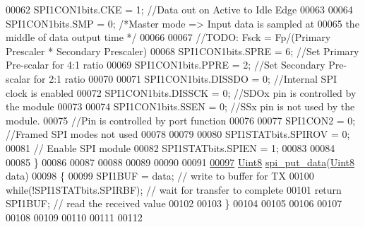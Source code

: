 \begin{DoxyCode}
00062         SPI1CON1bits.CKE        = 1;   \textcolor{comment}{//Data out on Active to Idle Edge}
00063 
00064         SPI1CON1bits.SMP        = 0;  \textcolor{comment}{/*Master mode => Input data is sampled at}
00065 \textcolor{comment}{                                        the middle of data output time */}
00066 
00067         \textcolor{comment}{//TODO: Fsck = Fp/(Primary Prescaler * Secondary Prescaler)}
00068         SPI1CON1bits.SPRE       = 6;     \textcolor{comment}{//Set Primary Pre-scalar for 4:1 ratio}
00069         SPI1CON1bits.PPRE       = 2;     \textcolor{comment}{//Set Secondary Pre-scalar for 2:1 ratio}
00070 
00071         SPI1CON1bits.DISSDO     = 0;     \textcolor{comment}{//Internal SPI clock is enabled}
00072         SPI1CON1bits.DISSCK     = 0;     \textcolor{comment}{//SDOx pin is controlled by the module}
00073 
00074         SPI1CON1bits.SSEN       = 0;     \textcolor{comment}{//SSx pin is not used by the module.}
00075                                          \textcolor{comment}{//Pin is controlled by port function}
00076 
00077         SPI1CON2                = 0;     \textcolor{comment}{//Framed SPI modes not used}
00078 
00079 
00080         SPI1STATbits.SPIROV     = 0;
00081         \textcolor{comment}{//  Enable SPI module}
00082         SPI1STATbits.SPIEN       = 1;
00083 
00084 
00085 \}
00086 
00087 
00088 
00089 
00090 
00091 
\hypertarget{a00032_source_l00097}{}\hyperlink{a00032_a19e2dff580e4d1b2198fa9108fca81ac}{00097} \hyperlink{a00072_af84840501dec18061d18a68c162a8fa2}{Uint8} \hyperlink{a00032_a19e2dff580e4d1b2198fa9108fca81ac}{spi\_put\_data}(\hyperlink{a00072_af84840501dec18061d18a68c162a8fa2}{Uint8} data)
00098 \{
00099     SPI1BUF = data;                  \textcolor{comment}{// write to buffer for TX}
00100     \textcolor{keywordflow}{while}(!SPI1STATbits.SPIRBF);             \textcolor{comment}{// wait for transfer to complete}
00101     \textcolor{keywordflow}{return} SPI1BUF;                  \textcolor{comment}{// read the received value}
00102 
00103 \}
00104 
00105 
00106 
00107 
00108 
00109 
00110 
00111 
00112 
\end{DoxyCode}
